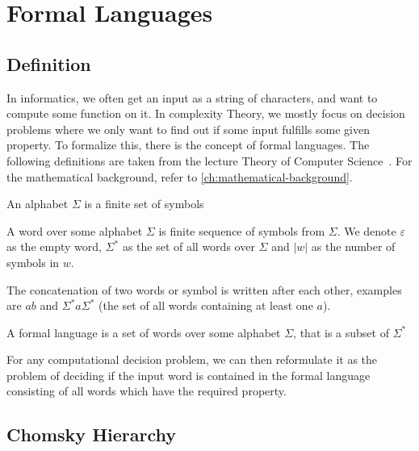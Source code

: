 \chapter{Formal Languages}\label{ch:formal-languages}


\section{Definition}\label{sec:definition}

In informatics, we often get an input as a string of characters, and want to compute some function on it.
In complexity Theory, we mostly focus on decision problems where we only want to find out if some input fulfills some given property.
To formalize this, there is the concept of formal languages.
The following definitions are taken from the lecture Theory of Computer Science~\cite{theory-cs}.
For the mathematical background, refer to \autoref{ch:mathematical-background}.

\begin{define}[Alphabet]
    An alphabet $\Sigma$ is a finite set of symbols
\end{define}

\begin{define}[Word]
    A word over some alphabet $\Sigma$ is finite sequence of symbols from $\Sigma$.
    We denote $\varepsilon$ as the empty word, $\Sigma^*$ as the set of all words over $\Sigma$ and $|w|$ as the number of symbols in $w$.
\end{define}

The concatenation of two words or symbol is written after each other, examples are $ab$ and $\Sigma^*a\Sigma^*$ (the set of all words containing at least one $a$).

\begin{define}
    A formal language is a set of words over some alphabet $\Sigma$, that is a subset of $\Sigma^*$
\end{define}

For any computational decision problem, we can then reformulate it as the problem of deciding if the input word is contained in the formal language consisting of all words which have the required property.


\section{Chomsky Hierarchy}\label{sec:chromsky-hierarchy}

